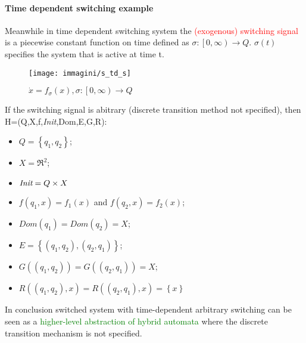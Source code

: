 \paragraph{Time dependent switching example} 
Meanwhile in time dependent switching system the \textcolor{red}{(exogenous) switching signal} is a piecewise constant function on time defined as $\sigma \colon \left[0,\infty\right) \to Q$. $\sigma(t)$ specifies the system that is active at time t.
\begin{figure}[H]
	\centering
	\texttt{[image: immagini/s\_td\_s]}
	\caption{$\dot{x}=f_{\sigma}(x), \sigma \colon \left[0,\infty\right) \to Q$} 
	\label{fig:stds}
\end{figure}
If the switching signal is abitrary (discrete transition method not specified), then H=(Q,X,f,\textit{Init},Dom,E,G,R):
 \begin{itemize}
	\item $Q=\left\{q_1,q_2\right\}$;
	\item $X=\Re^2$;
	\item $\emph{Init}=Q \times X$ 
	\item $f(q_1,x)=f_1(x)$ and $f(q_2,x)=f_2(x)$; 
	\item $Dom(q_1)=Dom(q_2)=X$;
	\item $E=\left\{(q_1,q_2),(q_2,q_1)\right\}$;
	\item$G((q_1,q_2))=G((q_2,q_1))=X$;
	\item$R((q_1,q_2),x)=R((q_2,q_1),x)=\left\{x \right\}$
\end{itemize}
In conclusion switched system with time-dependent arbitrary switching can be seen as a \textcolor{green}{higher-level abstraction of hybrid automata} where the discrete transition mechanism is not specified.
